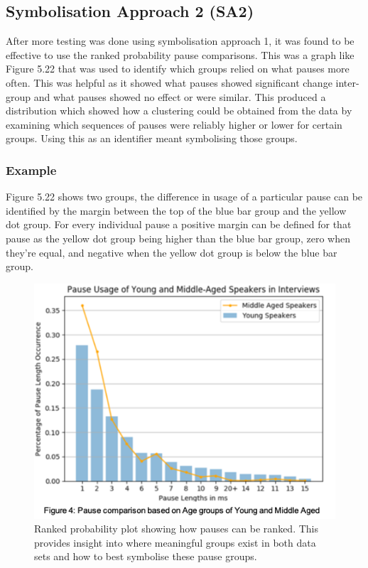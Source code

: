 \subsection{Symbolisation Approach 2 (SA2)}
After more testing was done using symbolisation approach 1, it was found to be effective to use the ranked probability pause comparisons. This was a graph like Figure 5.22 that was used to identify which groups relied on what pauses more often. This was helpful as it showed what pauses showed significant change inter-group and what pauses showed no effect or were similar. This produced a distribution which showed how a clustering could be obtained from the data by examining which sequences of pauses were reliably higher or lower for certain groups. Using this as an identifier meant symbolising those groups. 

\subsubsection{Example}
Figure 5.22 shows two groups, the difference in usage of a particular pause can be identified by the margin between the top of the blue bar group and the yellow dot group. For every individual pause a positive margin can be defined for that pause as the yellow dot group being higher than the blue bar group, zero when they're equal, and negative when the yellow dot group is below the blue bar group. 

\begin{figure}[htbp]
\begin{center}
\includegraphics[scale=1.4]{src/main-matter/methodology/symbolisation/pause-difference-intergroup}
\caption{Ranked probability plot showing how pauses can be ranked. This provides insight into where meaningful groups exist in both data sets and how to best symbolise these pause groups.}
\label{default}
\end{center}
\end{figure}


